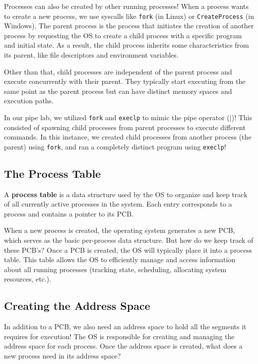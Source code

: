 \documentclass{report}
\newcommand{\definitionBegin}[1]{\begin{tcolorbox}[title={Definition: #1}]}
\newcommand{\definitionEnd}{\end{tcolorbox}}
\newcommand{\exampleBegin}[1]{\begin{tcolorbox}[colback=blue!5!white,colframe=black!75!blue,title={Example:
      #1}]}
\newcommand{\exampleEnd}{\end{tcolorbox}}
\begin{document}
Processes can also be created by other running processes! When a process wants to create a new
process, we use syscalls like \texttt{fork} (in Linux) or \texttt{CreateProcess} (in Windows). The
parent process is the process that initiates the creation of another process by requesting the OS to
create a child process with a specific program and initial state. As a result, the child process
inherits some characteristics from its parent, like file descriptors and environment variables. 

Other than that, child processes are independent of the parent process and execute concurrently with
their parent. They typically start executing from the same point as the parent process but can have
distinct memory spaces and execution paths. 

\exampleBegin{Pipe Up!}
In our pipe lab, we utilized \texttt{fork} and \texttt{execlp} to mimic the pipe operator ($|$)!
This consisted of spawning child processes from parent processes to execute different commands. In
this instance, we created child processes from another process (the parent) using \texttt{fork}, and
ran a completely distinct program using \texttt{execlp}!
\exampleEnd


\subsection{The Process Table}
\definitionBegin{Process Table}
A \textbf{process table} is a data structure used by the OS to organize and keep track of all
currently active processes in the system. Each entry corresponds to a process and contains a pointer
to its PCB.
\definitionEnd

When a new process is created, the operating system generates a new PCB, which serves as the basic
per-process data structure. But how do we keep track of these PCB's? Once a PCB is created, the OS
will typically place it into a process table. This table allows the OS to efficiently manage and
access information about all running processes (tracking state, scheduling, allocating system
resources, etc.). 

\subsection{Creating the Address Space}
In addition to a PCB, we also need an address space to hold all the segments it requires for
execution! The OS is responsible for creating and managing the address space for each process. Once
the address space is created, what does a new process need in its address space?
\end{document}
